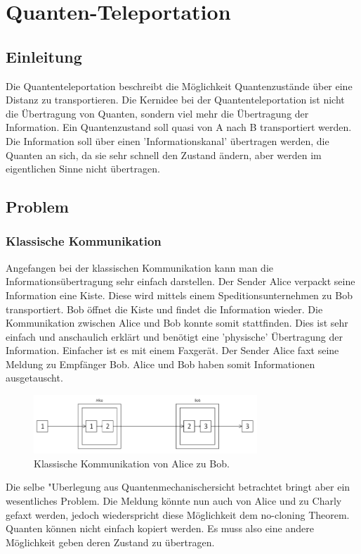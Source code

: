 \chapter{Quanten-Teleportation\label{chapter:teleport}}
\begin{refsection}



\section{Einleitung}
Die Quantenteleportation beschreibt die Möglichkeit Quantenzustände über eine Distanz zu transportieren. Die Kernidee bei der Quantenteleportation ist nicht die Übertragung von Quanten, sondern viel mehr die Übertragung der Information. Ein Quantenzustand soll quasi von A nach B transportiert werden. Die Information soll über einen 'Informationskanal' übertragen werden, die Quanten an sich, da sie sehr schnell den Zustand ändern, aber werden im eigentlichen Sinne nicht übertragen.

\section{Problem}
\subsection{Klassische Kommunikation}
Angefangen bei der klassischen Kommunikation kann man die Informationsübertragung sehr einfach darstellen. Der Sender Alice verpackt seine Information eine Kiste. Diese wird mittels einem Speditionsunternehmen zu Bob transportiert. Bob öffnet die Kiste und findet die Information wieder. Die Kommunikation zwischen Alice und Bob konnte somit stattfinden. Dies ist sehr einfach und anschaulich erklärt und benötigt eine 'physische' Übertragung der Information. Einfacher ist es mit einem Faxgerät. Der Sender Alice faxt seine Meldung zu Empfänger Bob. Alice und Bob haben somit Informationen ausgetauscht.
\begin{figure}
\center
\includegraphics[width=0.75\textwidth]{teleport/image/classic_communication.png}
\caption{Klassische Kommunikation von Alice zu Bob.}
\label{Klassische Kommunikation}
\end{figure}
Die selbe "Uberlegung aus Quantenmechanischersicht betrachtet bringt aber ein wesentliches Problem. Die Meldung könnte nun auch von Alice und zu Charly gefaxt werden, jedoch wiederspricht diese Möglichkeit dem no-cloning Theorem. Quanten können nicht einfach kopiert werden. Es muss also eine andere Möglichkeit geben deren Zustand zu übertragen.

\end{refsection}
